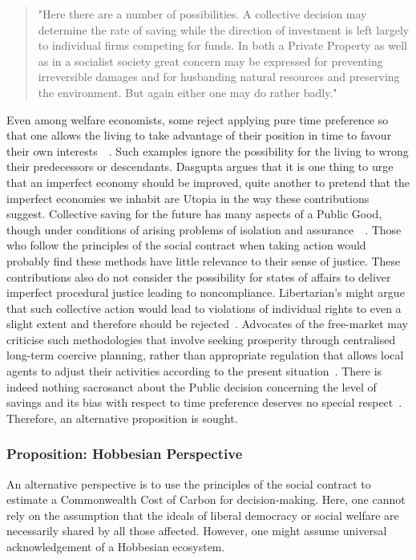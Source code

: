 \documentclass[11pt, oneside]{book}   	%
\begin{document}
\begin{quote}
"Here there are a number of possibilities. A collective decision may determine the rate of saving while the direction of investment is left largely to individual firms competing for funds. In both a Private Property as well as in a socialist society great concern may be expressed for preventing irreversible damages and for husbanding natural resources and preserving the environment. But again either one may do rather badly."~\cite{jr1}
\end{quote}

Even among welfare economists, some reject applying pure time preference so that one allows the living to take advantage of their position in time to favour their own interests~\cite{hs1}~\cite{fr1}. Such examples ignore the possibility for the living to wrong their predecessors or descendants. Dasgupta argues that it is one thing to urge that an imperfect economy should be improved, quite another to pretend that the imperfect economies we inhabit are Utopia in the way these contributions suggest. Collective saving for the future has many aspects of a Public Good, though under conditions of arising problems of isolation and assurance~\cite{as1}~\cite{ms1}.  Those who follow the principles of the social contract when taking action would probably find these methods have little relevance to their sense of justice. These contributions also do not consider the possibility for states of affairs to deliver imperfect procedural justice leading to noncompliance. Libertarian's might argue that such collective action would lead to violations of individual rights to even a slight extent and therefore should be rejected~\cite{rn1}. Advocates of the free-market may criticise such methodologies that involve seeking prosperity through centralised long-term coercive planning, rather than appropriate regulation that allows local agents to adjust their activities according to the present situation~\cite{fh1}. There is indeed nothing sacrosanct about the Public decision concerning the level of savings and its bias with respect to time preference deserves no special respect~\cite{jr1}. Therefore, an alternative proposition is sought.

\subsubsection{Proposition: Hobbesian Perspective}

An alternative perspective is to use the principles of the social contract to estimate a Commonwealth Cost of Carbon for decision-making.
Here, one cannot rely on the assumption that the ideals of liberal democracy or social welfare are necessarily shared by all those affected.
However, one might assume universal acknowledgement of a Hobbesian ecosystem.
\end{document}
